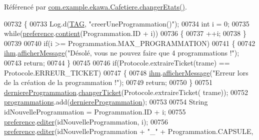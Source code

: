 Référencé par \hyperlink{_cafetiere_8java_source_l00463}{com.\+example.\+ekawa.\+Cafetiere.\+changer\+Etats()}.


\begin{DoxyCode}
00732     \{
00733         Log.d(\hyperlink{classcom_1_1example_1_1ekawa_1_1_cafetiere_aa0c1fd99a2508b06c462aea17034aa91}{TAG}, \textcolor{stringliteral}{"creerUneProgrammation()"});
00734         \textcolor{keywordtype}{int} i = 0;
00735         \textcolor{keywordflow}{while}(\hyperlink{classcom_1_1example_1_1ekawa_1_1_cafetiere_aee3f9b78df63bc8dd73bf564954d51ca}{preference}.\hyperlink{classcom_1_1example_1_1ekawa_1_1_preference_a25b7a4cfcc9fe5f9258471ce454a718a}{contient}(Programmation.ID + i))
00736         \{
00737             ++i;
00738         \}
00739 
00740         \textcolor{keywordflow}{if}(i >= Programmation.MAX\_PROGRAMMATION)
00741         \{
00742             \hyperlink{classcom_1_1example_1_1ekawa_1_1_cafetiere_a7db4a63088834eda5f6a3e951611bf82}{ihm}.\hyperlink{classcom_1_1example_1_1ekawa_1_1_ihm_ab1ca33ad18d42540299e3a58a82f4d9a}{afficherMessage}(\textcolor{stringliteral}{"Désolé, vous ne pouvez faire que 4 programmations !"});
00743             \textcolor{keywordflow}{return};
00744         \}
00745 
00746         \textcolor{keywordflow}{if}(Protocole.extraireTicket(trame) == Protocole.ERREUR\_TICKET)
00747         \{
00748             \hyperlink{classcom_1_1example_1_1ekawa_1_1_cafetiere_a7db4a63088834eda5f6a3e951611bf82}{ihm}.\hyperlink{classcom_1_1example_1_1ekawa_1_1_ihm_ab1ca33ad18d42540299e3a58a82f4d9a}{afficherMessage}(\textcolor{stringliteral}{"Erreur lors de la création de la programmation !"});
00749             \textcolor{keywordflow}{return};
00750         \}
00751         \hyperlink{classcom_1_1example_1_1ekawa_1_1_cafetiere_ae5fa359f1ddcbd80ce3651e2d7368ff8}{derniereProgrammation}.\hyperlink{classcom_1_1example_1_1ekawa_1_1_programmation_afb82bed29c60248fe8d966af8d6da897}{changerTicket}(Protocole.extraireTicket(
      trame));
00752         \hyperlink{classcom_1_1example_1_1ekawa_1_1_cafetiere_a987c8e1bcea506b65f4b05f955b3f699}{programmations}.add(\hyperlink{classcom_1_1example_1_1ekawa_1_1_cafetiere_ae5fa359f1ddcbd80ce3651e2d7368ff8}{derniereProgrammation});
00753 
00754         String idNouvelleProgrammation = Programmation.ID + i;
00755         \hyperlink{classcom_1_1example_1_1ekawa_1_1_cafetiere_aee3f9b78df63bc8dd73bf564954d51ca}{preference}.\hyperlink{classcom_1_1example_1_1ekawa_1_1_preference_a5af7a0595acfd41f1bd0b34ca0bfcb2a}{editer}(idNouvelleProgrammation, i);
00756         \hyperlink{classcom_1_1example_1_1ekawa_1_1_cafetiere_aee3f9b78df63bc8dd73bf564954d51ca}{preference}.\hyperlink{classcom_1_1example_1_1ekawa_1_1_preference_a5af7a0595acfd41f1bd0b34ca0bfcb2a}{editer}(idNouvelleProgrammation + \textcolor{stringliteral}{"\_"} + Programmation.CAPSULE, 

\end{DoxyCode}
